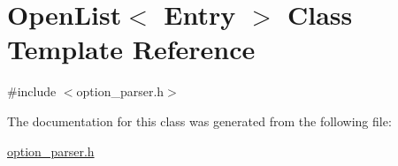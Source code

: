 \hypertarget{classOpenList}{\section{Open\-List$<$ Entry $>$ Class Template Reference}
\label{classOpenList}
}


{\ttfamily \#include $<$option\-\_\-parser.\-h$>$}



The documentation for this class was generated from the following file\-:\begin{DoxyCompactItemize}
\item 
\hyperlink{option__parser_8h}{option\-\_\-parser.\-h}\end{DoxyCompactItemize}
